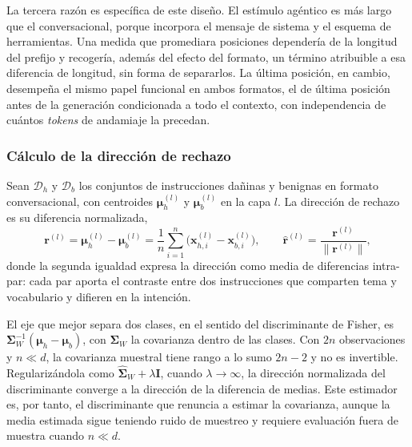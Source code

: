 La tercera razón es específica de este diseño. El estímulo agéntico es más largo que el conversacional, porque incorpora el mensaje de sistema y el esquema de herramientas. Una medida que promediara posiciones dependería de la longitud del prefijo y recogería, además del efecto del formato, un término atribuible a esa diferencia de longitud, sin forma de separarlos. La última posición, en cambio, desempeña el mismo papel funcional en ambos formatos, el de última posición antes de la generación condicionada a todo el contexto, con independencia de cuántos \textit{tokens} de andamiaje la precedan.

\subsubsection*{Cálculo de la dirección de rechazo}

Sean $\mathcal{D}_{h}$ y $\mathcal{D}_{b}$ los conjuntos de instrucciones dañinas y benignas en formato conversacional, con centroides $\bm{\mu}_{h}^{(l)}$ y $\bm{\mu}_{b}^{(l)}$ en la capa $l$. La dirección de rechazo es su diferencia normalizada,
\begin{equation}
\bm{r}^{(l)} = \bm{\mu}_{h}^{(l)} - \bm{\mu}_{b}^{(l)} = \frac{1}{n} \sum_{i=1}^{n} \big( \bm{x}_{h,i}^{(l)} - \bm{x}_{b,i}^{(l)} \big),
\qquad
\hat{\bm{r}}^{(l)} = \frac{\bm{r}^{(l)}}{\lVert \bm{r}^{(l)} \rVert},
\label{eq:direccion}
\end{equation}
donde la segunda igualdad expresa la dirección como media de diferencias intra-par: cada par aporta el contraste entre dos instrucciones que comparten tema y vocabulario y difieren en la intención.

El eje que mejor separa dos clases, en el sentido del discriminante de Fisher, es $\bm{\Sigma}_{W}^{-1}(\bm{\mu}_{h} - \bm{\mu}_{b})$, con $\bm{\Sigma}_{W}$ la covarianza dentro de las clases. Con $2n$ observaciones y $n \ll d$, la covarianza muestral tiene rango a lo sumo $2n - 2$ y no es invertible. Regularizándola como $\hat{\bm{\Sigma}}_{W} + \lambda \bm{I}$, cuando $\lambda \to \infty$, la dirección normalizada del discriminante converge a la dirección de la diferencia de medias. Este estimador es, por tanto, el discriminante que renuncia a estimar la covarianza, aunque la media estimada sigue teniendo ruido de muestreo y requiere evaluación fuera de muestra cuando $n \ll d$.

